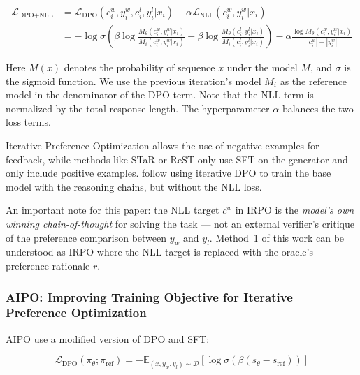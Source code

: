 \begin{align}
    \mathcal{L}_{\text{DPO+NLL}} & = \mathcal{L}_{\text{DPO}}(c_i^w, y_i^w, c_i^l, y_i^l|x_i) + \alpha\mathcal{L}_{\text{NLL}}(c_i^w, y_i^w|x_i) \nonumber                                                                                                                  \\
                                 & = -\log \sigma \left(\beta \log \frac{M_\theta(c_i^w, y_i^w|x_i)}{M_i(c_i^w, y_i^w|x_i)} - \beta \log \frac{M_\theta(c_i^l, y_i^l|x_i)}{M_i(c_i^l, y_i^l|x_i)}\right) - \alpha \frac{\log M_\theta(c_i^w, y_i^w|x_i)}{|c_i^w| + |y_i^w|}
    \label{eq:DPO_NLL}
\end{align}

Here $M(x)$ denotes the probability of sequence $x$ under the model $M$, and $\sigma$ is the sigmoid function. We use the previous iteration's model $M_i$ as the reference model in the denominator of the DPO term. Note that the NLL term is normalized by the total response length. The hyperparameter $\alpha$ balances the two loss terms.

Iterative Preference Optimization allows the use of negative examples for feedback, while methods like STaR \autocite{zelikman2022starbootstrappingreasoningreasoning} or ReST \autocite{gulcehre2023reinforcedselftrainingrestlanguage} only use SFT on the generator and only include positive examples. \autocite{wu2024thinkingllmsgeneralinstruction} follow using iterative DPO to train the base model with the reasoning chains, but without the NLL loss.

An important note for this paper: the NLL target $c^w$ in IRPO is the \emph{model's own winning chain-of-thought} for solving the task --- not an external verifier's critique of the preference comparison between $y_w$ and $y_l$. Method~1 of this work can be understood as IRPO where the NLL target is replaced with the oracle's preference rationale $r$.

\subsubsection{AIPO: Improving Training Objective for Iterative Preference Optimization}

AIPO \autocite{shen2024aipoimprovingtrainingobjective} use a modified version of DPO and SFT:

$$
    \mathcal{L}_{\text{DPO}}(\pi_\theta; \pi_{\text{ref}}) = -\mathbb{E}_{(x,y_w,y_l) \sim \mathcal{D}} \left[ \log \sigma \left( \beta(s_\theta - s_{\text{ref}}) \right) \right]
$$

